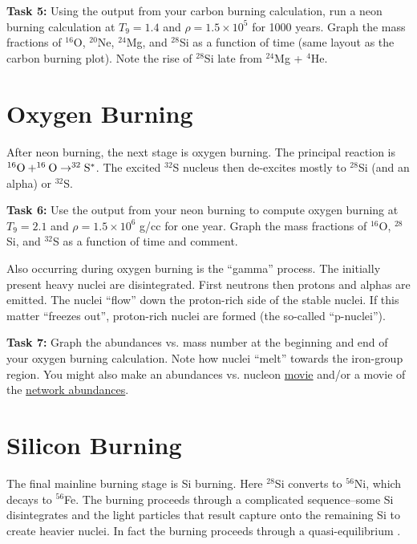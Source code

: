 \documentclass[manuscript]{aastex62}
\begin{document}
{\bf Task 5:}
Using the output from your carbon burning calculation, run a neon burning
calculation at $T_9 = 1.4$ and $\rho = 1.5 \times 10^5$ for 1000 years.
Graph the mass fractions of $^{16}$O, $^{20}$Ne, $^{24}$Mg, and $^{28}$Si
as a function of time (same layout as the carbon burning plot).  Note
the rise of $^{28}$Si late from $^{24}$Mg + $^4$He.

\section{Oxygen Burning} \label{sec:O}

After neon burning, the next stage is oxygen burning.  The principal reaction
is $^{16}{\rm O} + ^{16}{\rm O} \to ^{32}{\rm S}^*$.  The excited $^{32}$S
nucleus then de-excites mostly to $^{28}$Si (and an alpha)
or $^{32}$S.

{\bf Task 6:}  Use the output from your neon burning to compute oxygen burning
at $T_9 = 2.1$ and $\rho = 1.5\times 10^6$ g/cc for one year.  Graph the
mass fractions of $^{16}$O, $^{28}$Si, and $^{32}$S as a function of time and
comment.

Also occurring during oxygen burning is the ``gamma'' process.  The initially
present heavy nuclei are disintegrated.  First neutrons then protons and
alphas are emitted.  The nuclei ``flow'' down the proton-rich side of the
stable nuclei.  If this matter ``freezes out'', proton-rich nuclei are
formed (the so-called ``p-nuclei'').

{\bf Task 7:}  Graph the abundances vs. mass number at the beginning and end of
your oxygen burning calculation.  Note how nuclei ``melt'' towards the
iron-group region.  You might also make an abundances vs. nucleon
\href{https://wnutils.readthedocs.io/en/latest/animate_tutorial.html#animating-the-abundances-versus-nucleon-number}{movie} and/or a movie of the
\href{https://wnutils.readthedocs.io/en/latest/animate_tutorial.html#animating-the-network-abundances}{network abundances}.

\section{Silicon Burning} \label{sec:Si}

The final mainline burning stage is Si burning.  Here $^{28}$Si converts to
$^{56}$Ni, which decays to $^{56}$Fe.  The burning proceeds through a
complicated sequence--some Si disintegrates and the light particles that result
capture onto the remaining Si to create heavier nuclei.  In fact the
burning proceeds through a quasi-equilibrium
\cite{1968ApJS...16..299B,1998ApJ...498..808M}.
\end{document}
